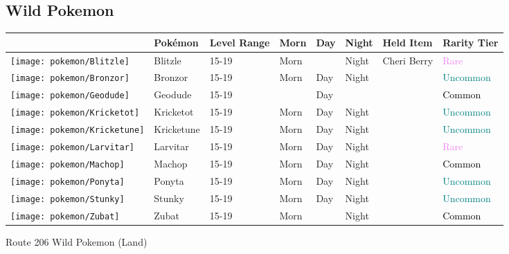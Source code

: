\subsection{Wild Pokemon}%
\label{subsec:WildPokemon}%
\begin{longtable}{||l l l l l l l l||}%
\hline%
&Pokémon&Level Range&Morn&Day&Night&Held Item&Rarity Tier\\%
\hline%
\endhead%
\hline%
\texttt{[image: pokemon/Blitzle]}&Blitzle&15{-}19&Morn&&Night&Cheri Berry&\textcolor{violet}{%
Rare%
}\\%
\hline%
\texttt{[image: pokemon/Bronzor]}&Bronzor&15{-}19&Morn&Day&Night&&\textcolor{teal}{%
Uncommon%
}\\%
\hline%
\texttt{[image: pokemon/Geodude]}&Geodude&15{-}19&&Day&&&\textcolor{black}{%
Common%
}\\%
\hline%
\texttt{[image: pokemon/Kricketot]}&Kricketot&15{-}19&Morn&Day&Night&&\textcolor{teal}{%
Uncommon%
}\\%
\hline%
\texttt{[image: pokemon/Kricketune]}&Kricketune&15{-}19&Morn&Day&Night&&\textcolor{teal}{%
Uncommon%
}\\%
\hline%
\texttt{[image: pokemon/Larvitar]}&Larvitar&15{-}19&Morn&Day&Night&&\textcolor{violet}{%
Rare%
}\\%
\hline%
\texttt{[image: pokemon/Machop]}&Machop&15{-}19&Morn&Day&Night&&\textcolor{black}{%
Common%
}\\%
\hline%
\texttt{[image: pokemon/Ponyta]}&Ponyta&15{-}19&Morn&Day&Night&&\textcolor{teal}{%
Uncommon%
}\\%
\hline%
\texttt{[image: pokemon/Stunky]}&Stunky&15{-}19&Morn&Day&Night&&\textcolor{teal}{%
Uncommon%
}\\%
\hline%
\texttt{[image: pokemon/Zubat]}&Zubat&15{-}19&Morn&&Night&&\textcolor{black}{%
Common%
}\\%
\hline%
\end{longtable}%
\caption{Route 206 Wild Pokemon (Land)}